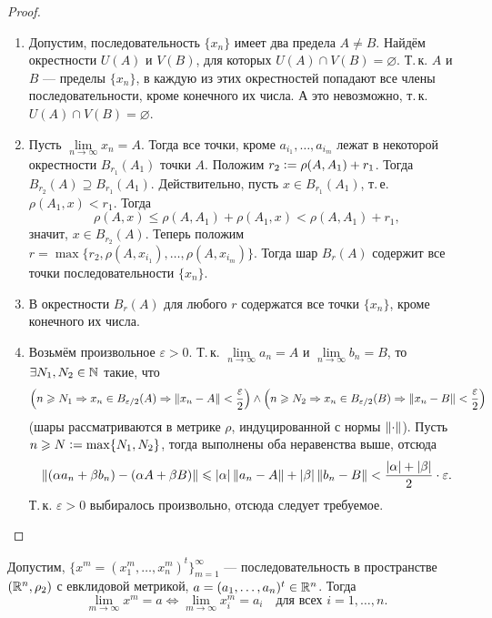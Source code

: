 \begin{proof}
    \begin{enumerate}
        \item Допустим, последовательность $\{x_n\}$ имеет два предела $A \ne B$. Найдём окрестности $U(A)$ и $V(B)$, для которых $U(A) \cap V(B) = \varnothing$. Т.\,к. $A$ и $B$ --- пределы $\{x_n\}$, в каждую из этих окрестностей попадают все члены последовательности, кроме конечного их числа. А это невозможно, т.\,к. $U(A) \cap V(B) = \varnothing$.
        \item Пусть $\lim\limits_{n \to \infty}x_n = A$. Тогда все точки, кроме $a_{i_1}, \ldots, a_{i_m}$ лежат в некоторой окрестности $B_{r_1}(A_1)$ точки $A$. Положим $r_2 \vcentcolon = \rho(A, A_1) + r_1$. Тогда $B_{r_2}(A) \supseteq B_{r_1}(A_1)$. Действительно, пусть $x \in B_{r_1}(A_1)$, т.\,е. $\rho(A_1, x) < r_1$. Тогда
            \[
                \rho(A, x) \leqslant \rho(A, A_1) + \rho(A_1, x) < \rho(A, A_1) + r_1,
            \]
            значит, $x \in B_{r_2}(A)$. Теперь положим $r = \max\{r_2, \rho(A, x_{i_1}), \ldots, \rho(A, x_{i_m})\}$. Тогда шар $B_r(A)$ содержит все точки последовательности $\{x_n\}$.
        \item В окрестности $B_r(A)$ для любого $r$ содержатся все точки $\{x_n\}$, кроме конечного их числа.
        \item Возьмём произвольное $\varepsilon > 0$. Т.\,к. $\lim\limits_{n \to \infty}a_n = A$ и $\lim\limits_{n \to \infty}b_n = B$, то $\exists N_1, N_2 \in \mathbb{N}$ такие, что
            \[
                \left(n \geqslant N_1 \Rightarrow x_n \in B_{\varepsilon / 2}(A) \Rightarrow \left\lVert x_n - A\right\rVert < \frac{\varepsilon}{2}\right) \wedge \left(n \geqslant N_2 \Rightarrow x_n \in B_{\varepsilon / 2}(B) \Rightarrow \left\lVert x_n - B\right\rVert < \frac{\varepsilon}{2}\right)
            \]
            (шары рассматриваются в метрике $\rho$, индуцированной с нормы $\left\lVert\cdot\right\rVert$). Пусть $n \geqslant N \vcentcolon = \max\{N_1, N_2\}$, тогда выполнены оба неравенства выше, отсюда
            \[
                \left\lVert(\alpha a_n + \beta b_n) - (\alpha A + \beta B)\right\rVert \leqslant \left\lvert\alpha\right\rvert\left\lVert a_n - A\right\rVert + \left\lvert\beta\right\rvert\left\lVert b_n - B\right\rVert < \frac{\left\lvert\alpha\right\rvert + \left\lvert\beta\right\rvert}{2} \cdot \varepsilon.
            \]
            Т.\,к. $\varepsilon > 0$ выбиралось произвольно, отсюда следует требуемое.
    \end{enumerate}
\end{proof}

\begin{theorem}
    Допустим, $\{x^m = (x_1^m, \ldots, x_n^m)^t\}_{m = 1}^\infty$ --- последовательность в пространстве $(\mathbb{R}^n, \rho_2)$ с евклидовой метрикой, $a = (a_1, \ldots, a_n)^t \in \mathbb{R}^n$. Тогда
    \[
        \lim_{m \to \infty}x^m = a \Leftrightarrow \lim_{m \to \infty}x^m_i = a_i\quad\text{для всех $i = 1, \ldots, n$}.
    \]
\end{theorem}


